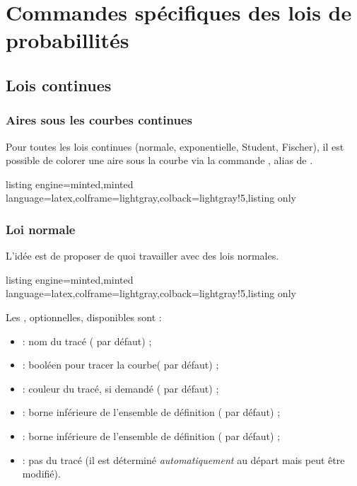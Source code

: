 \documentclass[11pt,a4paper]{ltxdoc}
\begin{document}
\pagebreak

\section{Commandes spécifiques des lois de probabillités}

\subsection{Lois continues}

\subsubsection{Aires sous les courbes continues}\label{loiinteg}
Pour toutes les lois continues (normale, exponentielle, Student, Fischer), il est possible de colorer une aire sous la courbe via la commande , alias de .

\begin{tcblisting}{listing engine=minted,minted language=latex,colframe=lightgray,colback=lightgray!5,listing only}
\end{tcblisting}

\subsubsection{Loi normale}\label{loinormale}

L'idée est de proposer de quoi travailler avec des lois normales.

\begin{tcblisting}{listing engine=minted,minted language=latex,colframe=lightgray,colback=lightgray!5,listing only}
\end{tcblisting}

Les \MontreCode{[clés]}, optionnelles, disponibles sont :

\smallskip

\begin{itemize}
  \item {} : nom du tracé ( par défaut) ;
  \item {} : booléen pour tracer la courbe( par défaut) ;
  \item {} : couleur du tracé, si demandé ( par défaut) ;
  \item {} : borne inférieure de l'ensemble de définition ( par défaut) ;
  \item {} : borne inférieure de l'ensemble de définition ( par défaut) ;
  \item {} : pas du tracé (il est déterminé \textit{automatiquement} au départ mais peut être modifié).
\end{itemize}
\end{document}

